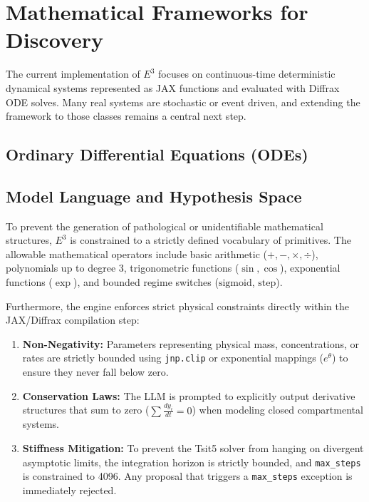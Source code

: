 \section{Mathematical Frameworks for Discovery}
\label{sec:math_framework}

The current implementation of $E^3$ focuses on continuous-time deterministic dynamical systems represented as JAX functions and evaluated with Diffrax ODE solves. Many real systems are stochastic or event driven, and extending the framework to those classes remains a central next step.

\subsection{Ordinary Differential Equations (ODEs)}
\subsection{Model Language and Hypothesis Space}
To prevent the generation of pathological or unidentifiable mathematical structures, $E^3$ is constrained to a strictly defined vocabulary of primitives. The allowable mathematical operators include basic arithmetic ($+, -, \times, \div$), polynomials up to degree 3, trigonometric functions ($\sin, \cos$), exponential functions ($\exp$), and bounded regime switches ($\text{sigmoid}$, $\text{step}$). 

Furthermore, the engine enforces strict physical constraints directly within the JAX/Diffrax compilation step:
\begin{enumerate}
    \item \textbf{Non-Negativity:} Parameters representing physical mass, concentrations, or rates are strictly bounded using \texttt{jnp.clip} or exponential mappings ($e^\theta$) to ensure they never fall below zero.
    \item \textbf{Conservation Laws:} The LLM is prompted to explicitly output derivative structures that sum to zero ($\sum \frac{dy_i}{dt} = 0$) when modeling closed compartmental systems.
    \item \textbf{Stiffness Mitigation:} To prevent the Tsit5 solver from hanging on divergent asymptotic limits, the integration horizon is strictly bounded, and \texttt{max\_steps} is constrained to 4096. Any proposal that triggers a \texttt{max\_steps} exception is immediately rejected.
\end{enumerate}

